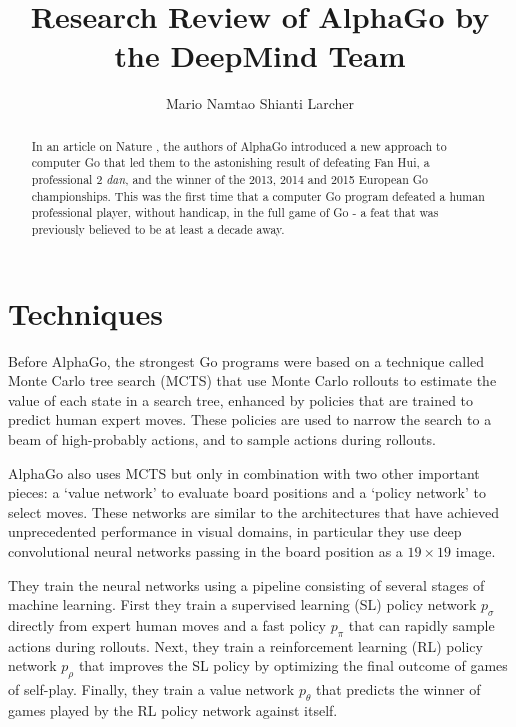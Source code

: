 \documentclass[10pt,a4paper]{article}
\begin{document}
\title{Research Review of AlphaGo by the DeepMind Team}
\author{Mario Namtao Shianti Larcher}

\maketitle

\begin{abstract}

In an article on Nature \cite{AlphaGoNature}, the authors of AlphaGo introduced a new approach to computer Go that led them to the astonishing result of defeating Fan Hui, a professional 2 \textit{dan}, and the winner of the 2013, 2014 and 2015 European Go championships. 
This was the first time that a computer Go program defeated a human professional player, without handicap, in the full game of Go - a feat that was previously believed to be at least a decade away.

\end{abstract}

\section{Techniques}

Before AlphaGo, the strongest Go programs were based on a technique called Monte Carlo tree search (MCTS) that use Monte Carlo rollouts to estimate the value of each state in a search tree, enhanced by policies that are trained to predict human expert moves. 
These policies are used to narrow the search to a beam of high-probably actions, and to sample actions during rollouts.  

AlphaGo also uses MCTS but only in combination with two other important pieces: a `value network' to evaluate board positions and a `policy network' to select moves.
These networks are similar to the architectures that have achieved unprecedented performance in visual domains, in particular they use deep convolutional neural networks passing in the board position as a $19 \times 19$ image.

They train the neural networks using a pipeline consisting of several stages of machine learning. First they train a supervised learning (SL) policy network $p_{\sigma}$ directly from expert human moves and a fast policy $p_{\pi}$ that can rapidly sample actions during rollouts.
Next, they train a reinforcement learning (RL) policy network $p_{\rho}$ that improves the SL policy by optimizing the final outcome of games of self-play. 
Finally, they train a value network $p_{\theta}$ that predicts the winner of games played by the RL policy network against itself.
\end{document}
